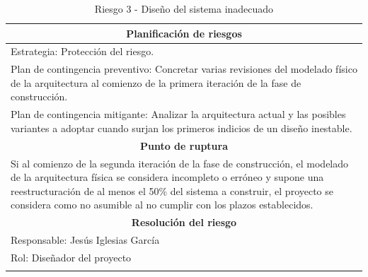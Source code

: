 \documentclass[12pt,a4paper, twoside]{report}
\begin{document}
\begin{longtable}{m{4cm}|m{5cm}|m{4cm}}
		\multicolumn{3}{|c|}{\textbf{Planificación de riesgos}} \\ \hline \hline
		\multicolumn{3}{|p{17cm}|}{Estrategia: Protección del riesgo.} \\ \hline
		\multicolumn{3}{|p{17cm}|}{Plan de contingencia preventivo: Concretar varias revisiones del modelado físico de la arquitectura al comienzo de la primera iteración de la fase de construcción.} \\ \hline
		\multicolumn{3}{|p{17cm}|}{Plan de contingencia mitigante: Analizar la arquitectura actual y las posibles variantes a adoptar cuando surjan los primeros indicios de un diseño inestable.} \\ \hline
						
		\multicolumn{3}{|c|}{\textbf{Punto de ruptura}} \\ \hline \hline
		\multicolumn{3}{|p{17cm}|}{Si al comienzo de la segunda iteración de la fase de construcción, el modelado de la arquitectura física se considera incompleto o erróneo y supone una reestructuración de al menos el 50\% del sistema a construir, el proyecto se considera como no asumible al no cumplir con los plazos establecidos.}\\ \hline
			
		\multicolumn{3}{|c|}{\textbf{Resolución del riesgo}} \\ \hline \hline
		\multicolumn{3}{|p{17cm}|}{Responsable: Jesús Iglesias García}\\ \hline
		\multicolumn{3}{|p{17cm}|}{Rol: Diseñador del proyecto} \\ \hline
		\caption{Riesgo 3 - Diseño del sistema inadecuado}		
	\end{longtable}
	
	\hspace{1cm}
				
\end{document}

